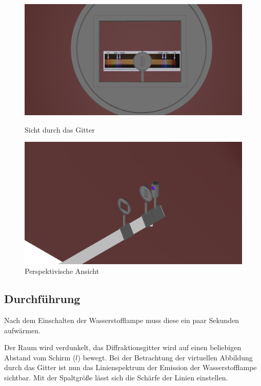 \documentclass[12pt, a4paper]{article}
\begin{document}
\begin{figure}[p]
    \centering
    
    \includegraphics[width=\textwidth]{Gittersicht.png}
    \caption[Sicht durch das Gitter]{Sicht durch das Gitter}

    \vspace*{\floatsep}

    \includegraphics[width=\textwidth]{Perspektive.png}
    \caption[Perspektivische Ansicht]{Perspektivische Ansicht}
\end{figure}

\newpage

\subsection{Durchführung}
Nach dem Einschalten der Wasserstofflampe muss diese ein paar Sekunden aufwärmen.

Der Raum wird verdunkelt, das Diffraktionsgitter wird auf einen beliebigen Abstand vom Schirm ($l$) bewegt.
Bei der Betrachtung der virtuellen Abbildung durch das Gitter ist nun das Linienspektrum der Emission der Wasserstofflampe sichtbar.
Mit der Spaltgröße lässt sich die Schärfe der Linien einstellen.
\end{document}
